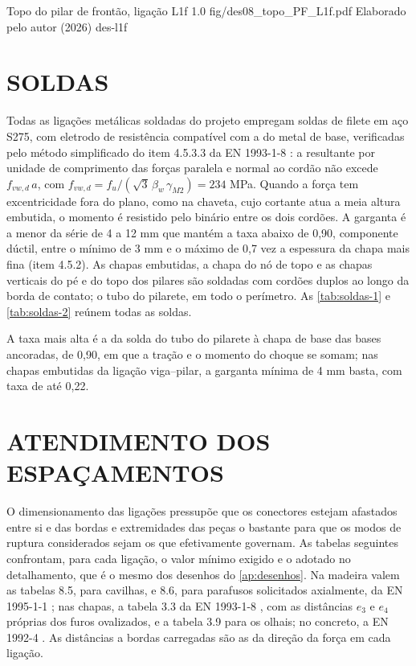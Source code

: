 \figura
{Topo do pilar de frontão, ligação L1f}
{1.0}
{fig/des08_topo_PF_L1f.pdf}
{Elaborado pelo autor (2026)}
{des-l1f}
{}
{}

\section{SOLDAS}\label{sec:soldas}

Todas as ligações metálicas soldadas do projeto empregam soldas de filete em aço
S275, com eletrodo de resistência compatível com a do metal de base, verificadas
pelo método simplificado do item 4.5.3.3 da EN 1993-1-8 \cite{EN1993-1-8:2005}: a
resultante por unidade de comprimento das forças paralela e normal ao cordão não
excede $f_{vw,d}\,a$, com $f_{vw,d} = f_u/(\sqrt{3}\,\beta_w\,\gamma_{M2}) = 234$ MPa.
Quando a força tem excentricidade fora do plano, como na chaveta, cujo cortante
atua a meia altura embutida, o momento é resistido pelo binário entre os dois
cordões. A garganta é a menor da série de 4 a 12 mm que mantém a taxa abaixo de
0,90, componente dúctil, entre o mínimo de 3 mm e o máximo de 0,7 vez a
espessura da chapa mais fina (item 4.5.2). As chapas embutidas, a chapa do nó de
topo e as chapas verticais do pé e do topo dos pilares são soldadas com cordões
duplos ao longo da borda de contato; o tubo do pilarete, em todo o perímetro.
As \autoref{tab:soldas-1} e \autoref{tab:soldas-2} reúnem todas as soldas.



A taxa mais alta é a da solda do tubo do pilarete à chapa de base das bases
ancoradas, de 0,90, em que a tração e o momento do choque se somam; nas chapas
embutidas da ligação viga--pilar, a garganta mínima de 4 mm basta, com taxa de
até 0,22.

\section{ATENDIMENTO DOS ESPAÇAMENTOS}\label{sec:espacamentos}

O dimensionamento das ligações pressupõe que os conectores estejam afastados
entre si e das bordas e extremidades das peças o bastante para que os modos de
ruptura considerados sejam os que efetivamente governam. As tabelas seguintes
confrontam, para cada ligação, o valor mínimo exigido e o adotado no
detalhamento, que é o mesmo dos desenhos do \autoref{ap:desenhos}. Na madeira
valem as tabelas 8.5, para cavilhas, e 8.6, para parafusos solicitados
axialmente, da EN 1995-1-1 \cite{EN1995-1-1:2004}; nas chapas, a tabela 3.3 da
EN 1993-1-8 \cite{EN1993-1-8:2005}, com as distâncias $e_3$ e $e_4$ próprias dos
furos ovalizados, e a tabela 3.9 para os olhais; no concreto, a
EN 1992-4 \cite{EN1992-4:2018}. As distâncias a bordas carregadas são as da
direção da força em cada ligação.

